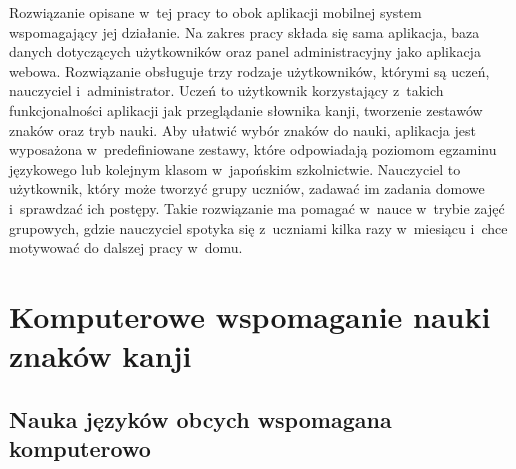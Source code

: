\documentclass[a4paper,twoside,12pt]{book}
\newcommand{\obcy}[1]{\emph{#1}}
\newcommand{\english}[1]{{\selectlanguage{british}\obcy{#1}}}
\begin{document}
Rozwiązanie opisane w~tej pracy to obok aplikacji mobilnej system wspomagający jej działanie. Na zakres pracy składa się sama aplikacja, baza danych dotyczących użytkowników oraz panel administracyjny jako aplikacja webowa. Rozwiązanie obsługuje trzy rodzaje użytkowników, którymi są uczeń, nauczyciel i~administrator. Uczeń to użytkownik korzystający z~takich funkcjonalności aplikacji jak przeglądanie słownika kanji, tworzenie zestawów znaków oraz tryb nauki. Aby ułatwić wybór znaków do nauki, aplikacja jest wyposażona w~predefiniowane zestawy, które odpowiadają poziomom egzaminu językowego lub kolejnym klasom w~japońskim szkolnictwie. Nauczyciel to użytkownik, który może tworzyć grupy uczniów, zadawać im zadania domowe i~sprawdzać ich postępy. Takie rozwiązanie ma pomagać w~nauce w~trybie zajęć grupowych, gdzie nauczyciel spotyka się z~uczniami kilka razy w~miesiącu i~chce motywować do dalszej pracy w~domu. 

\chapter{Komputerowe wspomaganie nauki znaków kanji}

\section{Nauka języków obcych wspomagana komputerowo}


\end{document}
